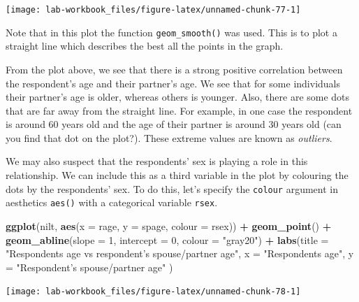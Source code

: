\documentclass[
]{book}
\newenvironment{Shaded}{\begin{snugshade}}{\end{snugshade}}
\newcommand{\AttributeTok}[1]{\textcolor[rgb]{0.13,0.29,0.53}{#1}}
\newcommand{\DecValTok}[1]{\textcolor[rgb]{0.00,0.00,0.81}{#1}}
\newcommand{\FunctionTok}[1]{\textcolor[rgb]{0.13,0.29,0.53}{\textbf{#1}}}
\newcommand{\NormalTok}[1]{#1}
\newcommand{\SpecialCharTok}[1]{\textcolor[rgb]{0.81,0.36,0.00}{\textbf{#1}}}
\newcommand{\StringTok}[1]{\textcolor[rgb]{0.31,0.60,0.02}{#1}}
\begin{document}
\begin{flushleft}\texttt{[image: lab-workbook\_files/figure-latex/unnamed-chunk-77-1]} \end{flushleft}

Note that in this plot the function \texttt{geom\_smooth()} was used. This is to plot a straight line which describes the best all the points in the graph.

From the plot above, we see that there is a strong positive correlation between the respondent's age and their partner's age. We see that for some individuals their partner's age is older, whereas others is younger. Also, there are some dots that are far away from the straight line. For example, in one case the respondent is around 60 years old and the age of their partner is around 30 years old (can you find that dot on the plot?). These extreme values are known as \emph{outliers}.

We may also suspect that the respondents' sex is playing a role in this relationship. We can include this as a third variable in the plot by colouring the dots by the respondents' sex. To do this, let's specify the \texttt{colour} argument in aesthetics \texttt{aes()} with a categorical variable \texttt{rsex}.

\begin{Shaded}
\begin{Highlighting}[]
\FunctionTok{ggplot}\NormalTok{(nilt, }\FunctionTok{aes}\NormalTok{(}\AttributeTok{x =}\NormalTok{ rage, }\AttributeTok{y =}\NormalTok{ spage, }\AttributeTok{colour =}\NormalTok{ rsex)) }\SpecialCharTok{+} 
  \FunctionTok{geom\_point}\NormalTok{() }\SpecialCharTok{+}
  \FunctionTok{geom\_abline}\NormalTok{(}\AttributeTok{slope =} \DecValTok{1}\NormalTok{, }\AttributeTok{intercept =} \DecValTok{0}\NormalTok{, }\AttributeTok{colour =} \StringTok{"gray20"}\NormalTok{) }\SpecialCharTok{+}
  \FunctionTok{labs}\NormalTok{(}\AttributeTok{title =} \StringTok{"Respondent\textquotesingle{}s age vs respondent’s spouse/partner age"}\NormalTok{, }
       \AttributeTok{x =} \StringTok{"Respondent\textquotesingle{}s age"}\NormalTok{, }\AttributeTok{y =} \StringTok{"Respondent’s spouse/partner age"}\NormalTok{ )}
\end{Highlighting}
\end{Shaded}

\begin{flushleft}\texttt{[image: lab-workbook\_files/figure-latex/unnamed-chunk-78-1]} \end{flushleft}
\end{document}
